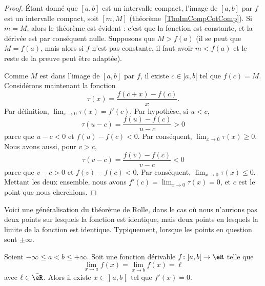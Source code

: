 \begin{proof}
	Étant donné que \( [a,b]\) est un intervalle compact, l'image de \( [a,b]\) par \( f\) est un intervalle compact, soit \( [m,M]\) (théorème~\ref{ThoImCompCotComp}). Si \( m=M\), alors le théorème est évident : c'est que la fonction est constante, et la dérivée est par conséquent nulle. Supposons que \( M> f(a)\) (il se peut que \( M=f(a)\), mais alors si \( f\) n'est pas constante, il faut avoir \( m<f(a)\) et le reste de la preuve peut être adaptée).

	Comme \( M\) est dans l'image de \( [a,b]\) par \( f\), il existe \( c\in ]a,b[\) tel que \( f(c)=M\). Considérons maintenant la fonction
	\begin{equation}
		\tau(x) =\frac{ f(c+x)-f(c) }{ x }.
	\end{equation}
	Par définition, \( \lim_{x\to 0}\tau(x)=f'(c)\). Par hypothèse, si \( u<c\),
	\begin{equation}
		\tau(u-c) = \frac{ f(u)-f(c) }{ u-c }>0
	\end{equation}
	parce que \( u-c<0\) et \( f(u)-f(c)<0\). Par conséquent, \( \lim_{x\to 0}\tau(x)\geq 0\). Nous avons aussi, pour \( v>c\),
	\begin{equation}
		\tau(v-c) = \frac{ f(v)-f(c) }{ v-c }<0
	\end{equation}
	parce que \( v-c>0\) et \( f(v)-f(c)<0\). Par conséquent, \( \lim_{x\to 0}\tau(x)\leq 0\). Mettant les deux ensemble, nous avons \( f'(c)=\lim_{x\to 0}\tau(x)=0\), et \( c\) est le point que nous cherchions.
\end{proof}

Voici une généralisation du théorème de Rolle, dans le cas où nous n'aurions pas deux points sur lesquels la fonction est identique, mais deux points en lesquels la limite de la fonction est identique. Typiquement, lorsque les points en question sont \( \pm\infty\).
\begin{theorem}       \label{THOooXDTBooFeSZoK}
	Soient \( -\infty\leq a<b\leq +\infty\). Soit une fonction dérivable \( f\colon \mathopen] a , b \mathclose[\to \eR\) telle que
		\begin{equation}
			\lim_{x\to a} f(x)=\lim_{x\to b} f(x)=\ell
		\end{equation}
		avec \( \ell\in \bar \eR\). Alors il existe \( x\in \mathopen] a , b \mathclose[\) tel que \( f'(x)=0\).
\end{theorem}

